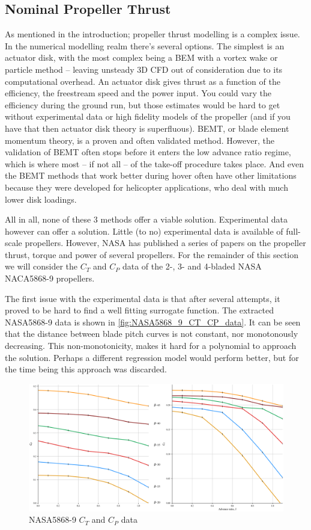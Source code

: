 \subsection{Nominal Propeller Thrust}\label{subsubsec:nominal_thrust_modelling}
As mentioned in the introduction; propeller thrust modelling is a complex issue. In the numerical modelling realm there's several options. The simplest is an actuator disk, with the most complex being a BEM with a vortex wake or particle method -- leaving unsteady 3D CFD out of consideration due to its computational overhead. An actuator disk gives thrust as a function of the efficiency, the freestream speed and the power input. You could vary the efficiency during the ground run, but those estimates would be hard to get without experimental data or high fidelity models of the propeller (and if you have that then actuator disk theory is superfluous). BEMT, or blade element momentum theory, is a proven and often validated method. However, the validation of BEMT often stops before it enters the low advance ratio regime, which is where most -- if not all -- of the take-off procedure takes place. And even the BEMT methods that work better during hover often have other limitations because they were developed for helicopter applications, who deal with much lower disk loadings.

All in all, none of these 3 methods offer a viable solution. Experimental data however can offer a solution. Little (to no) experimental data is available of full-scale propellers. However, NASA has published a series of papers on the propeller thrust, torque and power of several propellers. For the remainder of this section we will consider the $C_T$ and $C_P$ data of the 2-, 3- and 4-bladed NASA NACA5868-9 propellers.

The first issue with the experimental data is that after several attempts, it proved to be hard to find a well fitting surrogate function. The extracted NASA5868-9 data is shown in \autoref{fig:NASA5868_9_CT_CP_data}. It can be seen that the distance between blade pitch curves is not constant, nor monotonously decreasing. This non-monotonicity, makes it hard for a polynomial to approach the solution. Perhaps a different regression model would perform better, but for the time being this approach was discarded.

\begin{figure}[!ht]
    \centering
    \includegraphics[width=0.5\linewidth]{figures/NASA5868_9_data.png}
    \caption{NASA5868-9 $C_T$ and $C_P$ data}\label{fig:NASA5868_9_CT_CP_data}
\end{figure}

